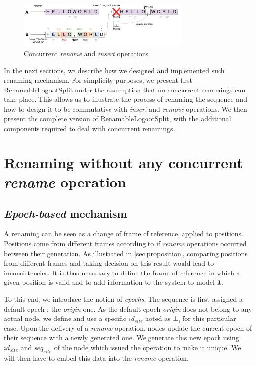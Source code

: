 \documentclass{article}
\theoremstyle{definition}
\begin{document}
\begin{figure}
    \centering
    \includegraphics[width=0.75\textwidth]{img/example-renaming.png}
    \caption{Concurrent \emph{rename} and \emph{insert} operations}
    \label{fig:example-renaming}
\end{figure}

In the next sections, we describe how we designed and implemented such renaming mechanism.
For simplicity purposes, we present first RenamableLogootSplit under the assumption that no concurrent renamings can take place.
This allows us to illustrate the process of renaming the sequence and how to design it to be commutative with \emph{insert} and \emph{remove} operations.
We then present the complete version of RenamableLogootSplit, with the additional components required to deal with concurrent renamings.

\section{Renaming without any concurrent \emph{rename} operation}

\subsection{\emph{Epoch-based} mechanism}

A renaming can be seen as a change of frame of reference, applied to positions.
Positions come from different frames according to if \emph{rename} operations occurred between their generation.
As illustrated in \autoref{sec:proposition}, comparing positions from different frames and taking decision on this result would lead to inconsistencies.
It is thus necessary to define the frame of reference in which a given position is valid and to add information to the system to model it.

To this end, we introduce the notion of \emph{epochs}.
The sequence is first assigned a default epoch : the \emph{origin} one.
As the default epoch \emph{origin} does not belong to any actual node, we define and use a specific $id_{site}$ noted as $\bot_{\mathbb{I}}$ for this particular case.
Upon the delivery of a \emph{rename} operation, nodes update the current epoch of their sequence with a newly generated one.
We generate this new epoch using $id_{site}$ and $seq_{site}$ of the node which issued the operation to make it unique.
We will then have to embed this data into the \emph{rename} operation.
\end{document}
